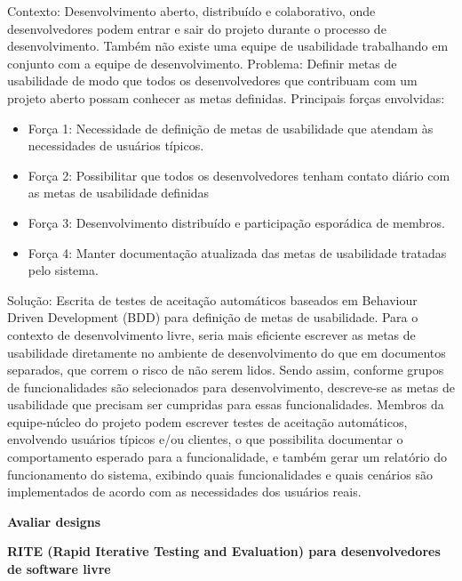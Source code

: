 Contexto: Desenvolvimento aberto, distribuído e colaborativo, onde desenvolvedores podem entrar e sair do projeto durante o processo de desenvolvimento. Também não existe uma equipe de usabilidade trabalhando em conjunto com a equipe de desenvolvimento.
Problema: Definir metas de usabilidade de modo que todos os desenvolvedores que contribuam com um projeto aberto possam conhecer as metas definidas. Principais forças envolvidas:
\begin{itemize}
\item Força 1: Necessidade de definição de metas de usabilidade que atendam às necessidades de usuários típicos.
\item Força 2: Possibilitar que todos os desenvolvedores tenham contato diário com as metas de usabilidade definidas
\item Força 3: Desenvolvimento distribuído e participação esporádica de membros.
\item Força 4: Manter documentação atualizada das metas de usabilidade tratadas pelo sistema.
\end{itemize}
Solução: Escrita de testes de aceitação automáticos baseados em Behaviour Driven Development
(BDD) para definição de metas de usabilidade. Para o contexto de desenvolvimento livre, seria mais eficiente escrever as metas de usabilidade diretamente no ambiente de desenvolvimento do que em documentos separados, que correm o risco de não serem lidos. Sendo assim, conforme grupos de funcionalidades são selecionados para desenvolvimento, descreve-se as metas de usabilidade que precisam ser cumpridas para essas funcionalidades. Membros da equipe-núcleo do projeto podem escrever testes de aceitação automáticos, envolvendo usuários típicos e/ou clientes, o que possibilita documentar o comportamento esperado para a funcionalidade, e também gerar um relatório do funcionamento do sistema, exibindo quais funcionalidades e quais cenários são implementados de acordo com as necessidades dos usuários reais.


%
\textbf{Avaliar designs}

\textbf{RITE (Rapid Iterative Testing and Evaluation)  para desenvolvedores de software livre}

